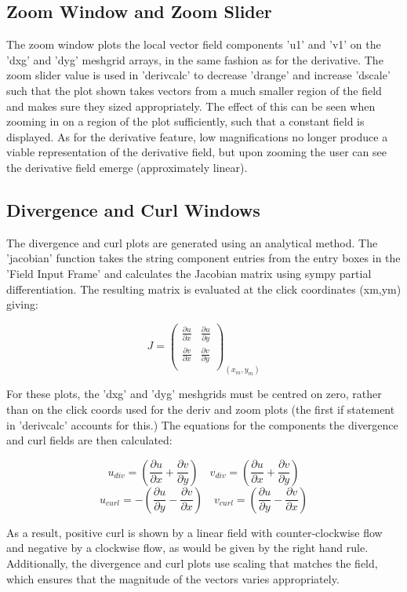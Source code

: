 \documentclass[11]{report}
\begin{document}
\subsection{Zoom Window and Zoom Slider}
The zoom window plots the local vector field components 'u1' and 'v1' on the 'dxg' and 'dyg' meshgrid arrays, in the same fashion as for the derivative. The zoom slider value is used in 'deriv\textunderscore calc' to decrease 'd\textunderscore range' and increase 'd\textunderscore scale' such that the plot shown takes vectors from a much smaller region of the field and makes sure they sized appropriately. The effect of this can be seen when zooming in on a region of the plot sufficiently, such that a constant field is displayed. As for the derivative feature, low magnifications no longer produce a viable representation of the derivative field, but upon zooming the user can see the derivative field emerge (approximately linear). 

\subsection{Divergence and Curl Windows}
The divergence and curl plots are generated using an analytical method. The 'jacobian' function takes the string component entries from the entry boxes in the 'Field Input Frame' and calculates the Jacobian matrix using sympy partial differentiation. The resulting matrix is evaluated at the click coordinates (x\textunderscore m,y\textunderscore m) giving:

\begin{equation}
	J =
	\begin{pmatrix}
		\frac{\partial u}{\partial x} & \frac{\partial u}{\partial y} \\
		\frac{\partial v}{\partial x} & \frac{\partial v}{\partial y} \\
	\end{pmatrix}
	_{(x_m,y_m)}
\end{equation}

For these plots, the 'dxg' and 'dyg' meshgrids must be centred on zero, rather than on the click coords used for the deriv and zoom plots (the first if statement in 'deriv\textunderscore calc' accounts for this.) The equations for the components the divergence and curl fields are then calculated:

\begin{equation}
	u_{div} = \left( \frac{\partial u}{\partial x} + \frac{\partial v}{\partial y} \right) \quad
	v_{div} = \left( \frac{\partial u}{\partial x} + \frac{\partial v}{\partial y} \right)	
\end{equation}
\begin{equation}
	u_{curl} = - \left( \frac{\partial u}{\partial y} - \frac{\partial v}{\partial x} \right) \quad
	v_{curl} = \left( \frac{\partial u}{\partial y} - \frac{\partial v}{\partial x} \right)
\end{equation}

As a result, positive curl is shown by a linear field with counter-clockwise flow and negative by a clockwise flow, as would be given by the right hand rule. Additionally, the divergence and curl plots use scaling that matches the field, which ensures that the magnitude of the vectors varies appropriately. 
\end{document}
